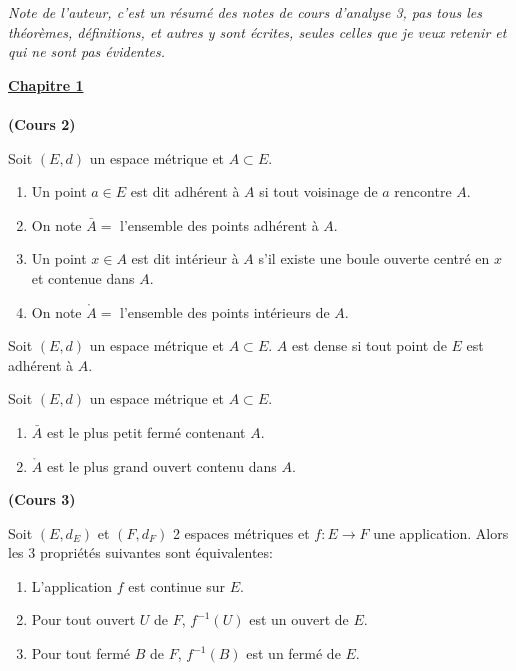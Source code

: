 \documentclass[12pt,a4paper]{article}
\begin{document}
\begin{flushleft}

\textit{Note de l'auteur, c'est un résumé des notes de cours d'analyse 3, pas tous les théorèmes, définitions, et autres y sont écrites, seules celles que je veux retenir et qui ne sont pas évidentes.}\dbs

\textbf{\underline{Chapitre 1}}\\~\\


\textbf{(Cours 2)}

\begin{mydef} 
Soit $(E,d)$ un espace métrique et $A \subset E$.
\begin{enumerate}
\item Un point $a \in E$ est dit adhérent à $A$ si tout voisinage de $a$ rencontre $A$.
\item On note $\bar{A} = $ l'ensemble des points adhérent à $A$.
\item Un point $x \in A$ est dit intérieur à $A$ s'il existe une boule ouverte centré en $x$ et contenue dans $A$.
\item On note $\mathring{A} = $ l'ensemble des points intérieurs de $A$.
\end{enumerate}
\end{mydef}

\begin{mydef}
Soit $(E,d)$ un espace métrique et $A \subset E$. $A$ est dense si tout point de $E$ est adhérent à $A$.
\end{mydef}

\begin{thm} 
Soit $(E,d)$ un espace métrique et $A \subset E$.
\begin{enumerate}
\item $\bar{A}$ est le plus petit fermé contenant $A$.
\item $\mathring{A}$ est le plus grand ouvert contenu dans $A$.
\end{enumerate}
\end{thm}

\textbf{(Cours 3)}

\begin{thm} 
Soit $(E,d_E)$ et $(F,d_F)$ 2 espaces métriques et $f: E \longrightarrow F$ une application. Alors les 3 propriétés suivantes sont équivalentes:
\begin{enumerate}
\item L'application $f$ est continue sur $E$.
\item Pour tout ouvert $U$ de $F$, $ f^{-1} (U) $ est un ouvert de $E$.
\item Pour tout fermé $B$ de $F$, $ f^{-1} (B) $ est un fermé de $E$.
\end{enumerate}
\end{thm}




\end{flushleft}
\end{document}
